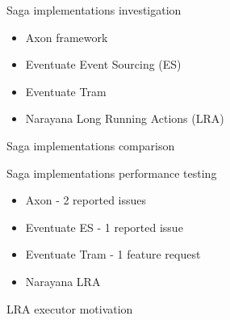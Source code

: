 \documentclass{beamer}
\begin{document}
\begin{frame}{Saga implementations investigation}

\Large
\begin{itemize}
    \item Axon framework
    \item Eventuate Event Sourcing (ES)
    \item Eventuate Tram
    \item Narayana Long Running Actions (LRA)
\end{itemize}

\end{frame}

\begin{frame}{Saga implementations comparison}

%


\end{frame}

\begin{frame}{Saga implementations performance testing}

\Large
\begin{itemize}
    \item Axon - 2 reported issues
    \item Eventuate ES - 1 reported issue
    \item Eventuate Tram - 1 feature request
    \item Narayana LRA
\end{itemize}

\end{frame}

\begin{frame}{LRA executor motivation}

%


\end{frame}
\end{document}
